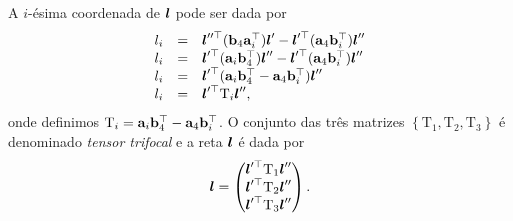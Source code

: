 A $i$-ésima coordenada de $\boldsymbol{l}$ pode ser dada por
\begin{equation*}
\begin{array}{rcl}
l_i&=&\boldsymbol{l}''^\top({\bf b}_4{\bf a}^\top_i)\boldsymbol{l}'-\boldsymbol{l}'^\top({\bf a}_4{\bf b}_i^\top)\boldsymbol{l}''\\
l_i&=&\boldsymbol{l}'^\top({\bf a}_i{\bf b}^\top_4)\boldsymbol{l}''-\boldsymbol{l}'^\top({\bf a}_4{\bf b}_i^\top)\boldsymbol{l}''\\
l_i&=&\boldsymbol{l}'^\top({\bf a}_i{\bf b}^\top_4-{\bf a}_4{\bf b}_i^\top)\boldsymbol{l}''\\
l_i&=&\boldsymbol{l}'^\top \mbox{T}_i\boldsymbol{l}'',
\end{array}
\end{equation*}
onde definimos $\mbox{T}_i={\bf a}_i{\bf b}^\top_4-{\bf a}_4{\bf b}_i^\top$. 
O conjunto das três matrizes $\left\{\mbox{T}_1,\mbox{T}_2,\mbox{T}_3\right\}$ é denominado {\it tensor trifocal} e a reta $\boldsymbol{l}$ é dada por
\begin{equation}\label{eq.tres-retas}
\boldsymbol{l}=
\begin{pmatrix}
\boldsymbol{l}'^\top \mbox{T}_1\boldsymbol{l}''\\
\boldsymbol{l}'^\top \mbox{T}_2\boldsymbol{l}''\\
\boldsymbol{l}'^\top \mbox{T}_3\boldsymbol{l}''
\end{pmatrix}.
\end{equation}

